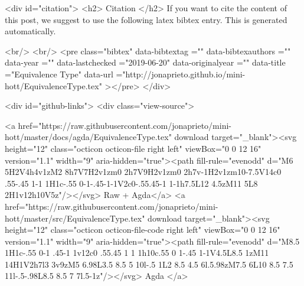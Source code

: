   
  <div id="citation">
  <h2> Citation </h2>
  If you want to cite the content of this post,
  we suggest to use the following latex bibtex entry.
  This is generated automatically.

  <br/>
  <br/>
  <pre class="bibtex"
       data-bibtextag =""
       data-bibtexauthors =""
       data-year =""
       data-lastchecked ="2019-06-20"
       data-originalyear =""
       data-title ="Equivalence Type"
       data-url ="http://jonaprieto.github.io/mini-hott/EquivalenceType.tex"
  ></pre>
  </div>
  

  <div id="github-links">
    <div class="view-source">
      
        <a href="https://raw.githubusercontent.com/jonaprieto/mini-hott/master/docs/agda/EquivalenceType.tex" download target="_blank"><svg height="12" class="octicon octicon-file right left" viewBox="0 0 12 16" version="1.1" width="9" aria-hidden="true"><path fill-rule="evenodd" d="M6 5H2V4h4v1zM2 8h7V7H2v1zm0 2h7V9H2v1zm0 2h7v-1H2v1zm10-7.5V14c0 .55-.45 1-1 1H1c-.55 0-1-.45-1-1V2c0-.55.45-1 1-1h7.5L12 4.5zM11 5L8 2H1v12h10V5z"/></svg> Raw + Agda</a>
        <a href="https://raw.githubusercontent.com/jonaprieto/mini-hott/master/src/EquivalenceType.tex" download target="_blank"><svg height="12" class="octicon octicon-file-code right left" viewBox="0 0 12 16" version="1.1" width="9" aria-hidden="true"><path fill-rule="evenodd" d="M8.5 1H1c-.55 0-1 .45-1 1v12c0 .55.45 1 1 1h10c.55 0 1-.45 1-1V4.5L8.5 1zM11 14H1V2h7l3 3v9zM5 6.98L3.5 8.5 5 10l-.5 1L2 8.5 4.5 6l.5.98zM7.5 6L10 8.5 7.5 11l-.5-.98L8.5 8.5 7 7l.5-1z"/></svg> Agda </a>
      
